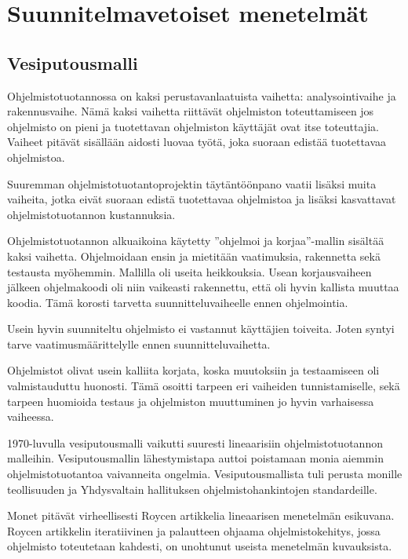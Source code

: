 \documentclass[finnish]{tktltiki2}
\theoremstyle{definition}
\theoremstyle{remark}
\begin{document}
\section{Suunnitelmavetoiset menetelmät}

\subsection{Vesiputousmalli}

Ohjelmistotuotannossa on kaksi perustavanlaatuista vaihetta: analysointivaihe ja rakennusvaihe. Nämä kaksi vaihetta riittävät ohjelmiston toteuttamiseen jos ohjelmisto on pieni ja tuotettavan ohjelmiston käyttäjät ovat itse toteuttajia. Vaiheet pitävät sisällään aidosti luovaa työtä, joka suoraan edistää tuotettavaa ohjelmistoa\cite{ROY70}.

Suuremman ohjelmistotuotantoprojektin täytäntöönpano vaatii lisäksi muita vaiheita, jotka eivät suoraan edistä tuotettavaa ohjelmistoa ja lisäksi kasvattavat ohjelmistotuotannon kustannuksia\cite{ROY70}.

Ohjelmistotuotannon alkuaikoina käytetty ''ohjelmoi ja korjaa''-mallin sisältää kaksi vaihetta. Ohjelmoidaan ensin ja mietitään vaatimuksia, rakennetta sekä testausta myöhemmin. Mallilla oli useita heikkouksia. Usean korjausvaiheen jälkeen ohjelmakoodi oli niin vaikeasti rakennettu, että oli hyvin kallista muuttaa koodia. Tämä korosti tarvetta suunnitteluvaiheelle ennen ohjelmointia\cite{BOE88}.

Usein hyvin suunniteltu ohjelmisto ei vastannut käyttäjien toiveita. Joten syntyi tarve vaatimusmäärittelylle ennen suunnitteluvaihetta\cite{BOE88}. 

Ohjelmistot olivat usein kalliita korjata, koska muutoksiin ja testaamiseen oli valmistauduttu huonosti. Tämä osoitti tarpeen eri vaiheiden tunnistamiselle, sekä tarpeen huomioida testaus ja ohjelmiston muuttuminen jo hyvin varhaisessa vaiheessa\cite{BOE88}. 

1970-luvulla vesiputousmalli vaikutti suuresti lineaarisiin ohjelmistotuotannon malleihin. Vesiputousmallin lähestymistapa auttoi poistamaan monia aiemmin ohjelmistotuotantoa vaivanneita ongelmia. Vesiputousmallista tuli perusta monille teollisuuden ja Yhdysvaltain hallituksen ohjelmistohankintojen standardeille\cite{BOE88}.

Monet pitävät virheellisesti Roycen artikkelia lineaarisen menetelmän esikuvana. Roycen artikkelin iteratiivinen ja palautteen ohjaama ohjelmistokehitys, jossa ohjelmisto toteutetaan kahdesti, on unohtunut useista menetelmän kuvauksista\cite{LAB03}.
\end{document}
